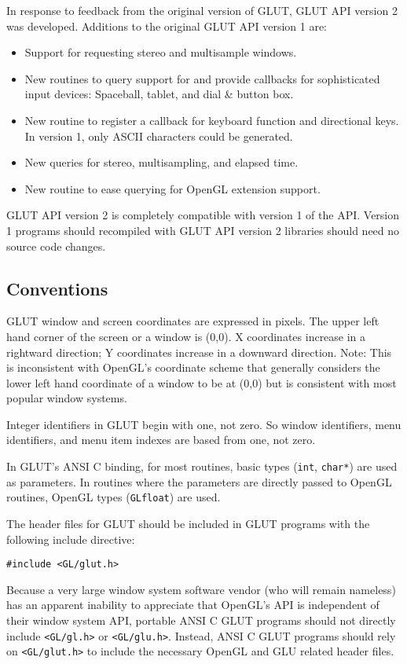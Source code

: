 In response to feedback from the original version of GLUT, GLUT API version
2 was developed.  Additions to the original GLUT API version 1 are:
\begin{itemize}
\item Support for requesting stereo and multisample windows.
\item New routines to query support for and provide callbacks for sophisticated
      input devices: Spaceball, tablet, and dial \& button box.
\item New routine to register a callback for keyboard function and directional
      keys.  In version 1, only ASCII characters could be generated.
\item New queries for stereo, multisampling, and elapsed time.
\item New routine to ease querying for OpenGL extension support.
\end{itemize}
GLUT API version 2 is completely compatible with version 1 of the API.
Version 1 programs should recompiled with GLUT API version 2 libraries
should need no source code changes.

\subsection{Conventions}

GLUT window and screen coordinates are expressed in pixels.  The upper left hand
corner of the screen or a window is (0,0).  X coordinates increase in a
rightward direction; Y coordinates increase in a downward direction.
Note:  This is inconsistent with OpenGL's coordinate scheme that generally
considers the lower left hand coordinate of a window to be at (0,0) but is
consistent with most popular window systems.

Integer identifiers in GLUT begin with one, not zero.  So window identifiers,
menu identifiers, and menu item indexes are based from one, not zero.

In GLUT's ANSI C binding, for most routines, basic types ({\tt int},
{\tt char*}) are used as parameters.  In routines where the parameters
are directly passed to OpenGL routines, OpenGL types ({\tt GLfloat})
are used.

The header files for GLUT should be included in GLUT programs
with the following include directive:
\begin{verbatim}
#include <GL/glut.h>
\end{verbatim}
Because a very large window system software vendor (who will remain
nameless) has an apparent inability to appreciate that OpenGL's API is
independent of their window system API, portable ANSI C GLUT programs should
not directly include {\tt <GL/gl.h>} or {\tt <GL/glu.h>}.  Instead,
ANSI C GLUT programs should rely on {\tt <GL/glut.h>} to include the necessary
OpenGL and GLU related header files.

